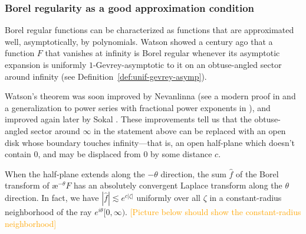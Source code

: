 \documentclass{article}
\theoremstyle{definition}
\newcommand{\aexp}{\text{\ae}}
\theoremstyle{plain}
\begin{document}
\subsubsection{Borel regularity as a good approximation condition}
Borel regular functions can be characterized as functions that are approximated well, asymptotically, by polynomials. Watson showed a century ago \cite{watson} that a function $F$ that vanishes at infinity is Borel regular whenever its asymptotic expansion is uniformly $1$-Gevrey-asymptotic to it on an obtuse-angled sector around infinity (see Definition~\ref{def:unif-gevrey-asymp}).

Watson's theorem was soon improved by Nevanlinna \cite{nevanlinna} (see a modern proof in \cite[Theorem~B.15]{nikolaev2023exact} and a generalization to power series with fractional power exponents in \cite{delabaere--rosoamanana}), and improved again later by Sokal \cite{sokal1980improvement}. These improvements tell us that the obtuse-angled sector around $\infty$ in the statement above can be replaced with an open disk whose boundary touches infinity---that is, an open half-plane which doesn't contain $0$, and may be displaced from $0$ by some distance $c$.
\begin{center}
\end{center}
When the half-plane extends along the $-\theta$ direction, the sum $\hat{f}$ of the Borel transform of $\aexp^{-\theta} F$ has an absolutely convergent Laplace transform along the $\theta$ direction. In fact, we have $|\hat{f}| \lesssim e^{c |\zeta|}$ uniformly over all $\zeta$ in a constant-radius neighborhood of the ray $e^{i\theta}[0, \infty)$. \textcolor{orange}{[Picture below should show the constant-radius neighborhood]}
\end{document}
